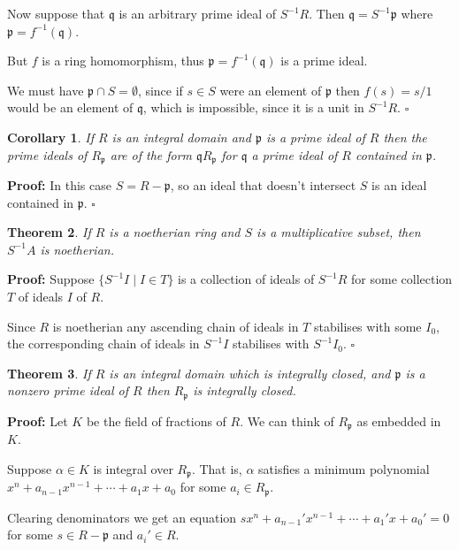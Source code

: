 \documentclass[10pt]{article}
\newcommand{\qed}{\square}
\newtheorem{theorem}{Theorem}[section]
\newtheorem{corollary}[theorem]{Corollary}
\begin{document}
Now suppose that $\mathfrak{q}$ is an arbitrary prime ideal of $S^{-1}R$. Then $\mathfrak{q} = S^{-1}\mathfrak{p}$ where $\mathfrak{p} = f^{-1}(\mathfrak{q})$.

But $f$ is a ring homomorphism, thus $\mathfrak{p} = f^{-1}(\mathfrak{q})$ is a prime ideal.

We must have $\mathfrak{p} \cap S = \emptyset$, since if $s \in S$ were an element of $\mathfrak{p}$ then $f(s) = s/1$ would be an element of $\mathfrak{q}$, which is impossible, since it is a unit in $S^{-1}R$. $\qed$

\begin{corollary}
If $R$ is an integral domain and $\mathfrak{p}$ is a prime ideal of $R$ then the prime ideals of $R_{\mathfrak{p}}$ are of the form $\mathfrak{q}R_{\mathfrak{p}}$ for $\mathfrak{q}$ a prime ideal of $R$ contained in $\mathfrak{p}$.
\end{corollary}

\textbf{Proof:} In this case $S = R - \mathfrak{p}$, so an ideal that doesn't intersect $S$ is an ideal contained in $\mathfrak{p}$. $\qed$

\begin{theorem} \label{locnoeth}
If $R$ is a noetherian ring and $S$ is a multiplicative subset, then $S^{-1}A$ is noetherian.
\end{theorem}

\textbf{Proof:} Suppose $\{S^{-1}I \;|\; I \in T\}$ is a collection of ideals of $S^{-1}R$ for some collection $T$ of ideals $I$ of $R$.

Since $R$ is noetherian any ascending chain of ideals in $T$ stabilises with some $I_0$, the corresponding chain of ideals in $S^{-1}I$ stabilises with $S^{-1}I_0$. $\qed$

\begin{theorem} \label{locintclosed}
If $R$ is an integral domain which is integrally closed, and $\mathfrak{p}$ is a nonzero prime ideal of $R$ then $R_{\mathfrak{p}}$ is integrally closed.
\end{theorem}

\textbf{Proof:}
Let $K$ be the field of fractions of $R$. We can think of $R_{\mathfrak{p}}$ as embedded in $K$.

Suppose $\alpha \in K$ is integral over $R_{\mathfrak{p}}$. That is, $\alpha$ satisfies a minimum polynomial $x^n + a_{n-1}x^{n-1} + \cdots + a_1x + a_0$ for some $a_i \in R_{\mathfrak{p}}$.

Clearing denominators we get an equation $sx^n + a_{n-1}'x^{n-1} + \cdots + a_1'x + a_0' = 0$ for some $s \in R - \mathfrak{p}$ and $a_i' \in R$.
\end{document}
